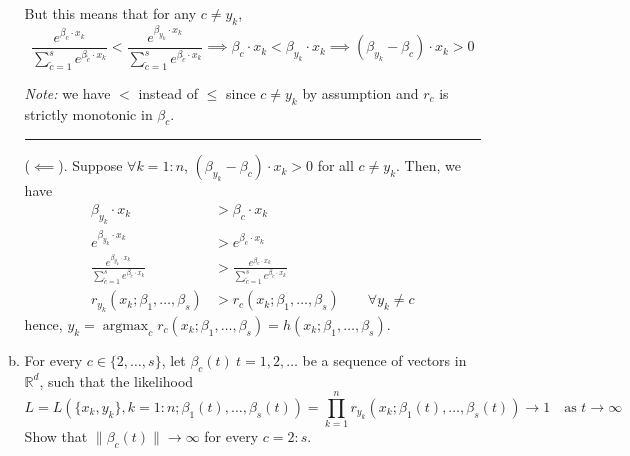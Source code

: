 \documentclass[11pt]{report}
\DeclareMathOperator*{\argmax}{\arg\max}
\renewcommand{\div}{\vspace*{10pt}\hrule\vspace*{10pt}}
\begin{document}
\begin{enumerate}[1.]
\begin{enumerate}[(a)]
		            But this means that for any $c \neq y_k$,
		            \[\frac{e^{\beta_c \cdot x_k}}{\sum_{\tilde{c} = 1}^s e^{\beta_{\tilde c} \cdot x_k}} < \frac{e^{\beta_{y_k} \cdot x_k}}{\sum_{\tilde{c} = 1}^s e^{\beta_{\tilde c} \cdot x_k}} \implies \beta_c \cdot x_k < \beta_{y_k} \cdot x_k \implies (\beta_{y_k} - \beta_c) \cdot x_k > 0\]

		            \emph{Note:} we have $<$ instead of $\leq$ since $c \neq y_k$ by assumption and $r_c$ is strictly monotonic in $\beta_c$.


		            \div


		            ($\impliedby$). Suppose $\forall k=1:n$, $(\beta_{y_k} - \beta_c) \cdot x_k > 0$ for all $c \neq y_k$. Then, we have
		            \begin{align*}
			            \beta_{y_k} \cdot x_k                                                                   & > \beta_c \cdot x_k                                                                   \\
			            e^{\beta_{y_k} \cdot x_k}                                                               & > e^{\beta_c \cdot x_k}                                                               \\
			            \frac{e^{\beta_{y_k} \cdot x_k}}{\sum_{\tilde{c} = 1}^s e^{\beta_{\tilde c} \cdot x_k}} & > \frac{e^{\beta_c \cdot x_k}}{\sum_{\tilde{c} = 1}^s e^{\beta_{\tilde c} \cdot x_k}} \\
			            r_{y_k}(x_k; \beta_1, \dots, \beta_s)                                                   & > r_c(x_k; \beta_1, \dots, \beta_s) \qquad \forall y_k \neq c
		            \end{align*}
		            hence, $y_k = \argmax_c r_c(x_k; \beta_1, \dots, \beta_s) = h(x_k; \beta_1, \dots, \beta_s)$.


		            \color{black}

		      \item For every $c\in\{2,\ldots,s\}$, let $\beta_c(t)\ t=1,2,\ldots$ be a sequence of vectors in $\mathds{R}^d$, such that
		            the likelihood
		            \[
			            L = L(\{x_k,y_k\}, k=1:n ; \beta_1(t),\ldots,\beta_s(t)) = \prod_{k=1}^n r_{y_k}(x_k;\beta_1(t),\ldots,\beta_s(t))
			            \to 1 \quad\text{as $t\to\infty$}
		            \]
		            Show that $\|{\beta_c(t)}\| \to\infty$ for every $c = 2:s$.


\end{enumerate}
\end{enumerate}
\end{document}
